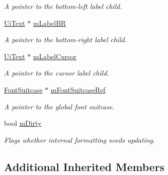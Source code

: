 \begin{DoxyCompactItemize}
\begin{DoxyCompactList}\small\item\em A pointer to the bottom-\/left label child. \end{DoxyCompactList}\item 
\hypertarget{class_ui_plot_aa9b435375ad0653bbd06c2f5ce9d5c00}{\hyperlink{class_ui_text}{Ui\-Text} $\ast$ \hyperlink{class_ui_plot_aa9b435375ad0653bbd06c2f5ce9d5c00}{m\-Label\-B\-R}}\label{class_ui_plot_aa9b435375ad0653bbd06c2f5ce9d5c00}

\begin{DoxyCompactList}\small\item\em A pointer to the bottom-\/right label child. \end{DoxyCompactList}\item 
\hypertarget{class_ui_plot_a0e6e29d763932114093f620297175eed}{\hyperlink{class_ui_text}{Ui\-Text} $\ast$ \hyperlink{class_ui_plot_a0e6e29d763932114093f620297175eed}{m\-Label\-Cursor}}\label{class_ui_plot_a0e6e29d763932114093f620297175eed}

\begin{DoxyCompactList}\small\item\em A pointer to the cursor label child. \end{DoxyCompactList}\item 
\hypertarget{class_ui_plot_a940504c63f58dff1171a1c9babb4400d}{\hyperlink{class_font_suitcase}{Font\-Suitcase} $\ast$ \hyperlink{class_ui_plot_a940504c63f58dff1171a1c9babb4400d}{m\-Font\-Suitcase\-Ref}}\label{class_ui_plot_a940504c63f58dff1171a1c9babb4400d}

\begin{DoxyCompactList}\small\item\em A pointer to the global font suitcase. \end{DoxyCompactList}\item 
\hypertarget{class_ui_plot_a2cc7c0039c7468b50eb38f025e7a7ec0}{bool \hyperlink{class_ui_plot_a2cc7c0039c7468b50eb38f025e7a7ec0}{m\-Dirty}}\label{class_ui_plot_a2cc7c0039c7468b50eb38f025e7a7ec0}

\begin{DoxyCompactList}\small\item\em Flags whether internal formatting needs updating. \end{DoxyCompactList}\end{DoxyCompactItemize}
\subsection*{Additional Inherited Members}


